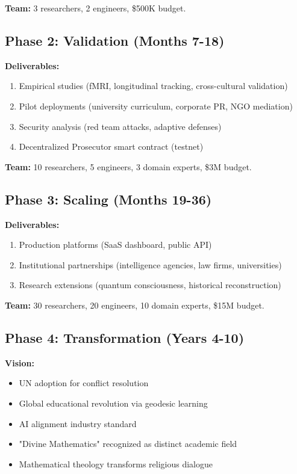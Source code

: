 \documentclass[11pt,a4paper]{article}
\theoremstyle{definition}
\theoremstyle{remark}
\begin{document}
\begin{small}
\textbf{Team:} 3 researchers, 2 engineers, \$500K budget.

\subsection{Phase 2: Validation (Months 7-18)}

\textbf{Deliverables:}
\begin{enumerate}
\item Empirical studies (fMRI, longitudinal tracking, cross-cultural validation)
\item Pilot deployments (university curriculum, corporate PR, NGO mediation)
\item Security analysis (red team attacks, adaptive defenses)
\item Decentralized Prosecutor smart contract (testnet)
\end{enumerate}

\textbf{Team:} 10 researchers, 5 engineers, 3 domain experts, \$3M budget.

\subsection{Phase 3: Scaling (Months 19-36)}

\textbf{Deliverables:}
\begin{enumerate}
\item Production platforms (SaaS dashboard, public API)
\item Institutional partnerships (intelligence agencies, law firms, universities)
\item Research extensions (quantum consciousness, historical reconstruction)
\end{enumerate}

\textbf{Team:} 30 researchers, 20 engineers, 10 domain experts, \$15M budget.

\subsection{Phase 4: Transformation (Years 4-10)}

\textbf{Vision:}
\begin{itemize}
\item UN adoption for conflict resolution
\item Global educational revolution via geodesic learning
\item AI alignment industry standard
\item "Divine Mathematics" recognized as distinct academic field
\item Mathematical theology transforms religious dialogue
\end{itemize}


\end{small}
\end{document}
